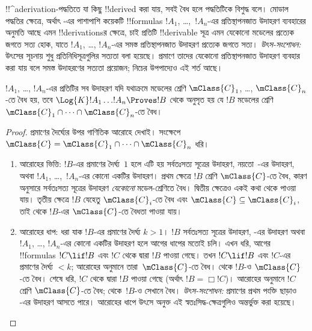 \documentclass[../../../include/open-logic-section]{subfiles}
\begin{document}


!!^a{derivation}-পদ্ধতিতে যা কিছু !!{derive}d করা যায়, সবই বৈধ হলে পদ্ধতিটিকে বিশুদ্ধ বলে। মোডাল পদ্ধতির ক্ষেত্রে, অর্থাৎ -এর পাশাপাশি কয়েকটি !!{formula}s $!A_1$, \dots,~$!A_n$-এর প্রতিস্থাপনজাত উদাহরণ ব্যবহারের অনুমতি আছে এমন !!{derivation}sর ক্ষেত্রে, চাই প্রতিটি !!{derivable} সূত্র এমন যেকোনো মডেলের প্রত্যেক জগতে সত্য হোক, যাতে $!A_1$, \dots, $!A_n$-এর সমস্ত প্রতিস্থাপনজাত উদাহরণ প্রত্যেক জগতে সত্য।
\emph{উৎস-সংশোধন:} উৎসের সূচনায় শুধু প্রতিনিধিসূত্রগুলির সত্যতা বলা হয়েছে। প্রমাণে তাদের যেকোনো প্রতিস্থাপনজাত উদাহরণ ব্যবহার করা যায় বলে সমস্ত উদাহরণের সত্যতা প্রয়োজন; নিচের উপপাদ্যেও এই শর্ত আছে।

\begin{thm}[বিশুদ্ধতার উপপাদ্য]
  $!A_1$, \dots, $!A_n$-এর প্রতিটির সব উদাহরণ যদি যথাক্রমে মডেলের শ্রেণি $\mClass{C}_1$, \dots, $\mClass{C}_n$-তে বৈধ হয়, তবে $\Log{K}!A_1\dots !A_n
  \Proves !B$ থেকে অনুসৃত হয় যে $!B$ মডেলের শ্রেণি $\mClass{C}_1 \cap \dots \cap \mClass{C}_n$-তে বৈধ।
\end{thm}

\begin{proof}
  প্রমাণের দৈর্ঘ্যের উপর গাণিতিক আরোহে দেখাই। সংক্ষেপে $\mClass{C} =
  \mClass{C}_1 \cap \dots \cap \mClass{C}_n$ ধরি।
  \begin{enumerate}
  \item আরোহের ভিত্তি: $!B$-এর প্রমাণের দৈর্ঘ্য~$1$ হলে এটি হয় সর্বতঃসত্য সূত্রের উদাহরণ, নয়তো~-এর উদাহরণ, অথবা $!A_1$, \dots,~$!A_n$-এর কোনো একটির উদাহরণ। প্রথম ক্ষেত্রে $!B$ শ্রেণি $\mClass{C}$-তে বৈধ, কারণ  অনুসারে সর্বতঃসত্য সূত্রের উদাহরণ \emph{যেকোনো} মডেল-শ্রেণিতে বৈধ। দ্বিতীয় ক্ষেত্রেও একই কথা  থেকে পাওয়া যায়। তৃতীয় ক্ষেত্রে $!B$ যেহেতু $\mClass{C}_i$-তে বৈধ এবং $\mClass{C} \subseteq \mClass{C}_i$, তাই  থেকে $!B$-এর $\mClass{C}$-তে বৈধতা পাওয়া যায়।
  \item আরোহের ধাপ: ধরা যাক $!B$-এর প্রমাণের দৈর্ঘ্য $k>1$। $!B$ সর্বতঃসত্য সূত্রের উদাহরণ, -এর উদাহরণ অথবা $!A_1$, \dots, $!A_n$-এর কোনো একটির উদাহরণ হলে আগের ধাপের মতোই চলি। এখন ধরি, আগের !!{formula}s $!C \lif !B$ এবং $!C$ থেকে \MP{} দ্বারা $!B$ পাওয়া গেছে। তখন $!C \lif !B$ এবং $!C$-এর প্রমাণের দৈর্ঘ্য $<k$; আরোহের অনুমানে তারা~$\mClass{C}$-তে বৈধ।  থেকে $!B$-ও $\mClass{C}$-তে বৈধ। শেষে ধরি, $!C$ থেকে \Nec{} দ্বারা $!B$ পাওয়া গেছে (অর্থাৎ $!B = \Box!C$)। আরোহের অনুমানে $!C$ শ্রেণি $\mClass{C}$-তে বৈধ;  থেকে~$!B$-ও সেখানে বৈধ।
  \emph{উৎস-সংশোধন:} প্রমাণের প্রথম পংক্তি ছাড়াও -এর উদাহরণ আসতে পারে। আরোহের ধাপে উৎসে অনুক্ত এই স্বতঃসিদ্ধ-ক্ষেত্রগুলিও অন্তর্ভুক্ত করা হয়েছে।
    \end{enumerate}
\end{proof}
\end{document}
